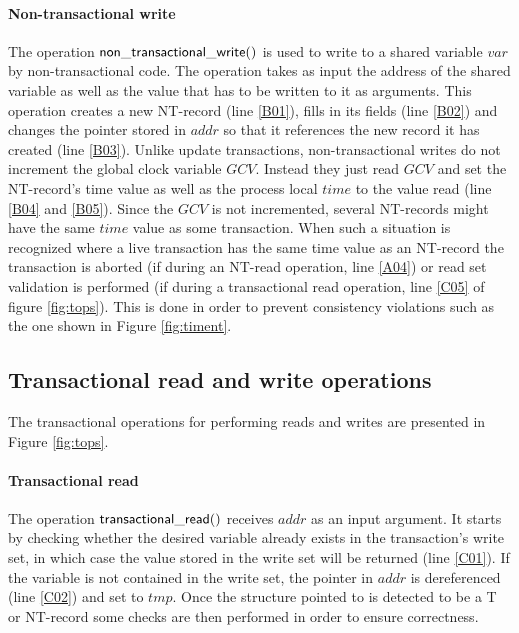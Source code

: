 \documentclass[11pt,letterpaper]{article}
\begin{document}
\paragraph{Non-transactional write}
The operation ${\sf non\_transactional\_write()}$ is used to write to 
a shared variable $\mathit{var}$ 
by non-transactional code.
The operation takes as input the address of the shared variable as well as the 
value that has to be written to it as arguments.
This operation  
creates a  new  NT-record  (line  \ref{B01}),  fills  in  its  fields  (line
\ref{B02})  and 
changes the pointer stored in $\mathit{addr}$ so that it references the 
new record it has created  (line \ref{B03}).
Unlike update transactions, non-transactional writes do not increment
the global clock variable $\mathit{GCV}$.
Instead they just read $\mathit{GCV}$ and set the NT-record's time value as well as
the process local $\mathit{time}$ to the value read (line \ref{B04} and \ref{B05}).
Since the $\mathit{GCV}$ is not incremented, several NT-records might have the same
$\mathit{time}$ value as some transaction.
When such a situation is recognized where a live transaction has the same time value
as an NT-record the transaction is aborted (if during an NT-read operation,
line \ref{A04}) or read set validation is performed (if during a transactional
read operation, line \ref{C05} of figure \ref{fig:tops}).
This is done in order to prevent consistency violations such as the one shown 
in Figure \ref{fig:timent}.


\subsection{Transactional read and write operations}

The transactional operations for performing reads and writes are 
presented in Figure \ref{fig:tops}. 

\paragraph{Transactional read}

The operation ${\sf  transactional\_read()}$ receives $\mathit{addr}$ as an
input argument. It starts by checking  
whether the  desired variable already  exists in the  transaction{}'s write
set, in which  
case  the   value  stored  in  the   write  set  will   be  returned  (line
\ref{C01}). If the variable is not contained  
in  the write  set, the  pointer in  $\mathit{addr}$ is  dereferenced (line
\ref{C02}) and set to $\mathit{tmp}$. Once the structure pointed to is detected to be a T or NT-record
some checks are then performed in order to ensure correctness.
\end{document}
